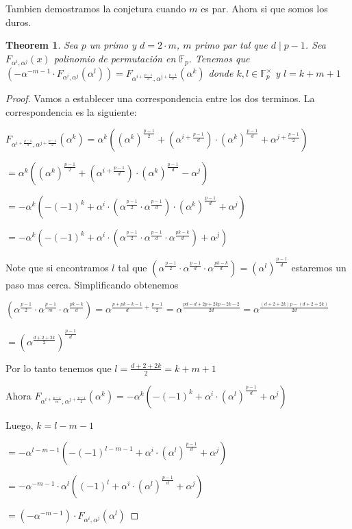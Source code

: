 \documentclass[12pt]{article}
\newtheorem{theorem}{Theorem}
\begin{document}
Tambien demostramos la conjetura cuando $m$ es par. Ahora si que somos los duros.

\begin{theorem}
Sea $p$ un primo y $d = 2\cdot m$, $m$ primo par tal que $d\mid p-1$. Sea $F_{\alpha^i,\alpha^j}(x)$ polinomio de permutación en $\mathbb{F}_p$. Tenemos que $(-\alpha^{-m-1}\cdot F_{\alpha^i,\alpha^j}(\alpha^l)) = F_{\alpha^{i+\frac{p-1}{d}},\alpha^{j+\frac{p-1}{2}}}(\alpha^{k})$ donde $k,l \in \mathbb{F}_p^\times$ y $l=k+m+1$    
\end{theorem}

\begin{proof}
Vamos a establecer una correspondencia entre los dos terminos. La correspondencia es la siguiente:

$F_{\alpha^{i+\frac{p-1}{d}},\alpha^{j+\frac{p-1}{2}}}(\alpha^{k}) = \alpha^k((\alpha^k)^{\frac{p-1}{2}}+(\alpha^{i+\frac{p-1}{d}})\cdot(\alpha^k)^{\frac{p-1}{d}}+\alpha^{j+\frac{p-1}{2}})$

$ = \alpha^k((\alpha^k)^{\frac{p-1}{2}}+(\alpha^{i+\frac{p-1}{d}})\cdot(\alpha^k)^{\frac{p-1}{d}}-\alpha^{j})$

$ = -\alpha^k(-(-1)^k+\alpha^{i}\cdot (\alpha^{\frac{p-1}{2}}\cdot \alpha^{\frac{p-1}{d}})\cdot(\alpha^k)^{\frac{p-1}{d}}+\alpha^{j})$

$ = -\alpha^k(-(-1)^k+\alpha^{i}\cdot (\alpha^{\frac{p-1}{2}}\cdot \alpha^{\frac{p-1}{d}} \cdot \alpha^{\frac{pk-k}{d}})+\alpha^{j})$

Note que si encontramos $l$ tal que $(\alpha^{\frac{p-1}{2}}\cdot \alpha^{\frac{p-1}{d}} \cdot \alpha^{\frac{pk-k}{d}}) = (\alpha^{l})^{\frac{p-1}{d}}$ estaremos un paso mas cerca. Simplificando obtenemos

$(\alpha^{\frac{p-1}{2}}\cdot \alpha^{\frac{p-1}{m}} \cdot \alpha^{\frac{pk-k}{d}}) = \alpha^{\frac{p+pk-k-1}{d}+\frac{p-1}{2}}=\alpha^{\frac{pd-d+2p+2kp-2k-2}{2d}} = \alpha^{\frac{\left( d+2+2k \right)p-\left( d+2+2k \right)}{2d}}$

$ = (\alpha^{\frac{d+2+2k}{2}})^{\frac{p-1}{d}} $

Por lo tanto tenemos que $l=\frac{d+2+2k}{2}=k+m+1$

Ahora $F_{\alpha^{i+\frac{p-1}{m}},\alpha^{j+\frac{p-1}{2}}}(\alpha^{k}) = -\alpha^k(-(-1)^k+\alpha^{i}\cdot (\alpha^{l})^{\frac{p-1}{d}}+\alpha^{j})$

Luego, $k = l-m-1$

$ = -\alpha^{l-m-1}(-(-1)^{l-m-1}+\alpha^{i}\cdot (\alpha^{l})^{\frac{p-1}{d}}+\alpha^{j})$

$ = -\alpha^{-m-1}\cdot \alpha^{l}((-1)^{l}+\alpha^{i}\cdot (\alpha^{l})^{\frac{p-1}{d}}+\alpha^{j})$

$ = \left(-\alpha^{-m-1}\right)\cdot F_{\alpha^i,\alpha^j}(\alpha^l)$
\end{proof}
\end{document}

